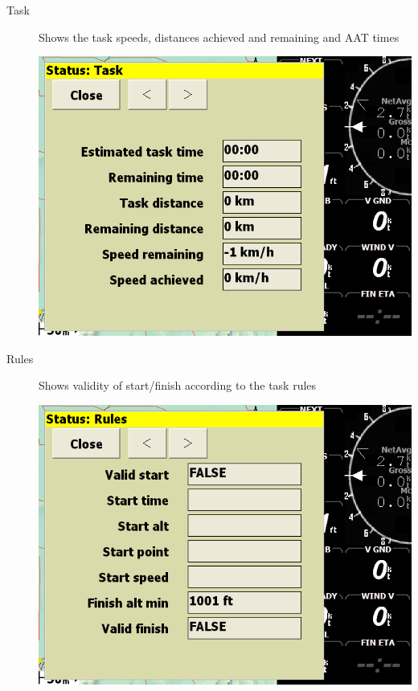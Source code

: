 \documentclass[a4paper,12pt]{refrep}
\begin{document}
\begin{description}
\item[Task] Shows the task speeds, distances achieved and remaining and AAT
times
\begin{center}
\includegraphics[angle=0,width=\linewidth,keepaspectratio='true']{figures/status-task.png}
\end{center}

\item[Rules] Shows validity of start/finish according to the task rules
\begin{center}
\includegraphics[angle=0,width=\linewidth,keepaspectratio='true']{figures/status-rules.png}
\end{center}


\end{description}
\end{document}
